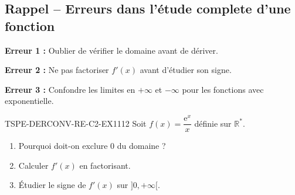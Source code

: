 

\subsection*{Rappel -- Erreurs dans l'étude complete d'une fonction}

\textbf{Erreur 1 :} Oublier de vérifier le domaine avant de dériver.

\textbf{Erreur 2 :} Ne pas factoriser $f'(x)$ avant d'étudier son signe.

\textbf{Erreur 3 :} Confondre les limites en $+\infty$ et $-\infty$ pour les fonctions avec exponentielle.

\begin{exercice}{TSPE-DERCONV-RE-C2-EX1}{1}{12}
Soit $f(x) = \dfrac{\mathrm{e}^x}{x}$ définie sur $\mathbb{R}^*$.
\begin{enumerate}
  \item Pourquoi doit-on exclure $0$ du domaine ?
  \item Calculer $f'(x)$ en factorisant.
  \item Étudier le signe de $f'(x)$ sur $]0, +\infty[$.
\end{enumerate}
\end{exercice}

